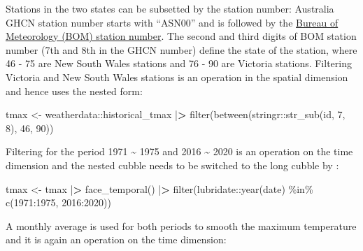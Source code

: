 \documentclass{article}
\newenvironment{Shaded}{\begin{snugshade}}{\end{snugshade}}
\newcommand{\DecValTok}[1]{\textcolor[rgb]{0.00,0.00,0.81}{#1}}
\newcommand{\ErrorTok}[1]{\textcolor[rgb]{0.64,0.00,0.00}{\textbf{#1}}}
\newcommand{\FunctionTok}[1]{\textcolor[rgb]{0.00,0.00,0.00}{#1}}
\newcommand{\NormalTok}[1]{#1}
\newcommand{\OtherTok}[1]{\textcolor[rgb]{0.56,0.35,0.01}{#1}}
\newcommand{\SpecialCharTok}[1]{\textcolor[rgb]{0.00,0.00,0.00}{#1}}
\begin{document}
Stations in the two states can be subsetted by the station number: Australia GHCN station number starts with ``ASN00'' and is followed by the \href{http://www.bom.gov.au/climate/cdo/about/site-num.shtml}{Bureau of Meteorology (BOM) station number}. The second and third digits of BOM station number (7th and 8th in the GHCN number) define the state of the station, where 46 - 75 are New South Wales stations and 76 - 90 are Victoria stations. Filtering Victoria and New South Wales stations is an operation in the spatial dimension and hence uses the nested form:

\begin{Shaded}
\begin{Highlighting}[]
\NormalTok{tmax }\OtherTok{\textless{}{-}}\NormalTok{ weatherdata}\SpecialCharTok{::}\NormalTok{historical\_tmax }\SpecialCharTok{|}\ErrorTok{\textgreater{}}
  \FunctionTok{filter}\NormalTok{(}\FunctionTok{between}\NormalTok{(stringr}\SpecialCharTok{::}\FunctionTok{str\_sub}\NormalTok{(id, }\DecValTok{7}\NormalTok{, }\DecValTok{8}\NormalTok{), }\DecValTok{46}\NormalTok{, }\DecValTok{90}\NormalTok{))}
\end{Highlighting}
\end{Shaded}

Filtering for the period 1971 \textasciitilde{} 1975 and 2016 \textasciitilde{} 2020 is an operation on the time dimension and the nested cubble needs to be switched to the long cubble by :

\begin{Shaded}
\begin{Highlighting}[]
\NormalTok{tmax }\OtherTok{\textless{}{-}}\NormalTok{ tmax }\SpecialCharTok{|}\ErrorTok{\textgreater{}} 
  \FunctionTok{face\_temporal}\NormalTok{() }\SpecialCharTok{|}\ErrorTok{\textgreater{}}
  \FunctionTok{filter}\NormalTok{(lubridate}\SpecialCharTok{::}\FunctionTok{year}\NormalTok{(date) }\SpecialCharTok{\%in\%} \FunctionTok{c}\NormalTok{(}\DecValTok{1971}\SpecialCharTok{:}\DecValTok{1975}\NormalTok{, }\DecValTok{2016}\SpecialCharTok{:}\DecValTok{2020}\NormalTok{)) }
\end{Highlighting}
\end{Shaded}

A monthly average is used for both periods to smooth the maximum temperature and it is again an operation on the time dimension:
\end{document}
